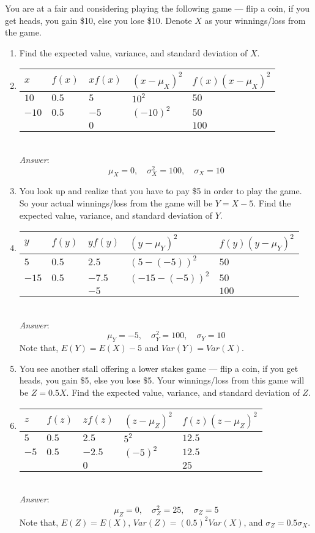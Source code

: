 \documentclass{./../handout}
\begin{document}
You are at a fair and considering playing the following game --- flip a coin, if you get heads, you gain \$10, else you lose \$10. Denote $X$ as your winnings/loss from the game.
  \begin{enumerate}

\item Find the expected value, variance, and standard deviation of $X$. 
\item[] \begin{tabularx}{0.8\textwidth}{P{2cm}P{1cm}YYY}
\toprule
$x$ & $f(x)$ & $x f(x)$ & $(x-\mu_X)^2$ & $f(x)(x-\mu_X)^2$ \\ \midrule
$10$ & $0.5$ & $5$ & $10^2$ & $50$ \\
$-10$ & $0.5$ & $-5$ & $(-10)^2$ & $50$ \\ \midrule
 & & $0$ & & $100$ \\ \bottomrule
\end{tabularx} \\

\textit{Answer}:
$$ \mu_X = 0, \quad \sigma^2_X = 100, \quad \sigma_X = 10$$

\newpage
\item You look up and realize that you have to pay \$5 in order to play the game. So your actual winnings/loss from the game will be $Y=X-5$. Find the expected value, variance, and standard deviation of $Y$. 
\item[] \begin{tabularx}{0.8\textwidth}{P{2cm}P{1cm}YYY}
\toprule
$y$ & $f(y)$ & $y f(y)$ & $(y-\mu_Y)^2$ & $f(y)(y-\mu_Y)^2$ \\ \midrule
$5$ & $0.5$ & $2.5$ & $(5-(-5))^2$ & $50$ \\
$-15$ & $0.5$ & $-7.5$ & $(-15-(-5))^2$ & $50$ \\ \midrule
 & & $-5$ & & $100$ \\ \bottomrule
\end{tabularx} \\

\textit{Answer}:
$$ \mu_Y = -5, \quad \sigma^2_Y = 100, \quad \sigma_Y = 10$$   
Note that, $E(Y) = E(X)-5$ and $Var(Y) = Var(X)$. \\


\item You see another stall offering a lower stakes game --- flip a coin, if you get heads, you gain \$5, else you lose \$5. Your winnings/loss from this game will be $Z=0.5X$. Find the expected value, variance, and standard deviation of $Z$. 
\item[] \begin{tabularx}{0.8\textwidth}{P{2cm}P{1cm}YYY}
\toprule
$z$ & $f(z)$ & $z f(z)$ & $(z-\mu_Z)^2$ & $f(z)(z-\mu_Z)^2$ \\ \midrule
$5$ & $0.5$ & $2.5$ & $5^2$ & $12.5$ \\
$-5$ & $0.5$ & $-2.5$ & $(-5)^2$ & $12.5$ \\ \midrule
 & & $0$ & & $25$ \\ \bottomrule
\end{tabularx} \\

\textit{Answer}:
$$ \mu_Z = 0, \quad \sigma^2_Z = 25, \quad \sigma_Z = 5$$
Note that, $E(Z) = E(X)$, $Var(Z) = (0.5)^2 Var(X)$, and $\sigma_Z=0.5 \sigma_X$. \\

  \end{enumerate}
\end{document}
